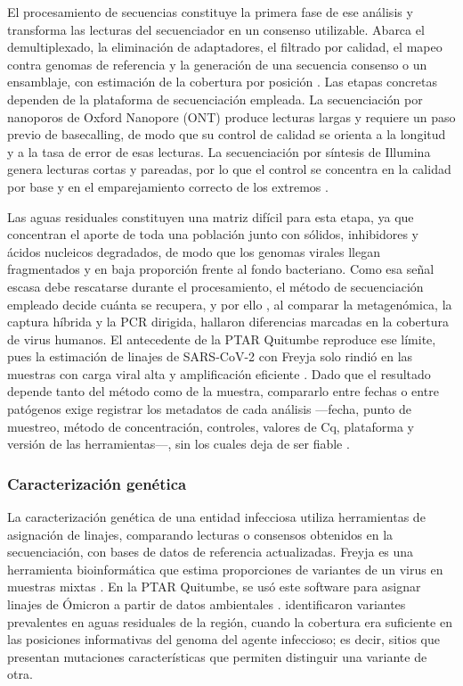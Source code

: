 El procesamiento de secuencias constituye la primera fase de ese análisis y transforma las lecturas del secuenciador en un consenso utilizable. Abarca el demultiplexado, la eliminación de adaptadores, el filtrado por calidad, el mapeo contra genomas de referencia y la generación de una secuencia consenso o un ensamblaje, con estimación de la cobertura por posición \cite{Dash_2024}. Las etapas concretas dependen de la plataforma de secuenciación empleada. La secuenciación por nanoporos de Oxford Nanopore (ONT) produce lecturas largas y requiere un paso previo de basecalling, de modo que su control de calidad se orienta a la longitud y a la tasa de error de esas lecturas. La secuenciación por síntesis de Illumina genera lecturas cortas y pareadas, por lo que el control se concentra en la calidad por base y en el emparejamiento correcto de los extremos \cite{Dash_2024}.

Las aguas residuales constituyen una matriz difícil para esta etapa, ya que concentran el aporte de toda una población junto con sólidos, inhibidores y ácidos nucleicos degradados, de modo que los genomas virales llegan fragmentados y en baja proporción frente al fondo bacteriano. Como esa señal escasa debe rescatarse durante el procesamiento, el método de secuenciación empleado decide cuánta se recupera, y por ello , al comparar la metagenómica, la captura híbrida y la PCR dirigida, hallaron diferencias marcadas en la cobertura de virus humanos. El antecedente de la PTAR Quitumbe reproduce ese límite, pues la estimación de linajes de SARS-CoV-2 con Freyja solo rindió en las muestras con carga viral alta y amplificación eficiente \cite{MejiaCalle_2024}. Dado que el resultado depende tanto del método como de la muestra, compararlo entre fechas o entre patógenos exige registrar los metadatos de cada análisis —fecha, punto de muestreo, método de concentración, controles, valores de Cq, plataforma y versión de las herramientas—, sin los cuales deja de ser fiable \cite{Parkins_2023}.

\subsubsection{Caracterización genética}

La caracterización genética de una entidad infecciosa utiliza herramientas de asignación de linajes, comparando lecturas o consensos obtenidos en la secuenciación, con bases de datos de referencia actualizadas. Freyja es una herramienta bioinformática que estima proporciones de variantes de un virus en muestras mixtas \cite{Karthikeyan_2022}. En la PTAR Quitumbe, se usó este software para asignar linajes de Ómicron a partir de datos ambientales \cite{MejiaCalle_2024}.  identificaron variantes prevalentes en aguas residuales de la región, cuando la cobertura era suficiente en las posiciones informativas del genoma del agente infeccioso; es decir, sitios que presentan mutaciones características que permiten distinguir una variante de otra.

